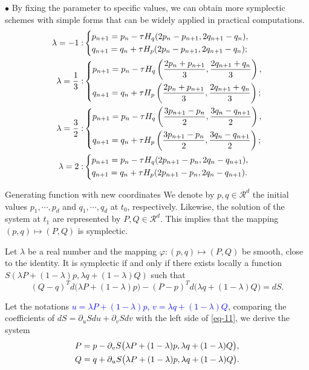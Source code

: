 \documentclass[10pt]{beamer}
\begin{document}
\begin{frame}
\quad\textcolor[rgb]{0,0,1}{$\bullet$} By fixing the parameter to specific values, we can obtain more symplectic schemes with simple forms that can be widely applied in practical computations.
\begin{subequations}\label{eq-10}
\begin{align}
\lambda=-1:&\left\{\aligned
&p_{n+1}=p_n-\tau H_q(2p_n-p_{n+1},2q_{n+1}-q_n),\\
&q_{n+1}=q_n+\tau H_p(2p_n-p_{n+1},2q_{n+1}-q_n);
\endaligned\right.\label{eq-10-a}\\
\lambda=\frac{1}{3}:&\left\{\aligned
&p_{n+1}=p_n-\tau H_q\left(\frac{2p_n+p_{n+1}}{3},\frac{2q_{n+1}+q_n}{3}\right),\\
&q_{n+1}=q_n+\tau H_p\left(\frac{2p_n+p_{n+1}}{3},\frac{2q_{n+1}+q_n}{3}\right);
\endaligned\right.\label{eq-10-b}\\ 
\lambda=\frac{3}{2}:&\left\{\aligned
&p_{n+1}=p_n-\tau H_q\left(\frac{3p_{n+1}-p_n}{2},\frac{3q_n-q_{n+1}}{2}\right),\\
&q_{n+1}=q_n+\tau H_p\left(\frac{3p_{n+1}-p_n}{2},\frac{3q_n-q_{n+1}}{2}\right);
\endaligned\right.\label{eq-10-c}\\
\lambda=2:&\left\{\aligned
&p_{n+1}=p_n-\tau H_q(2p_{n+1}-p_n,2q_n-q_{n+1}),\\
&q_{n+1}=q_n+\tau H_p(2p_{n+1}-p_n,2q_n-q_{n+1}).
\endaligned\right.\label{eq-10-d}
\end{align}
\end{subequations}	
\end{frame}	

\begin{frame}{Generating function with new coordinates}
We denote by $p,q \in\mathcal{R}^d$ the initial values $p_1,\cdots,p_d$ and $q_1,\cdots,q_d$ at $t_0$, respectively. Likewise, the solution of the system at $t_1$ are represented by $P,Q \in\mathcal{R}^d$. This implies that the mapping $(p,q) \mapsto (P,Q)$ is symplectic.

\begin{theorem}
Let $\lambda$ be a real number and the mapping $\varphi:(p,q) \mapsto (P,Q)$ be smooth, close to the identity. It is symplectic if and only if there exists locally a function $S(\lambda P+(1-\lambda)p,\lambda q+(1-\lambda)Q)$ such that
\begin{equation}\label{eq-11}
(Q-q)^Td\big(\lambda P+(1-\lambda)p\big)-(P-p)^Td\big(\lambda q+(1-\lambda)Q\big)=dS.
\end{equation}
\end{theorem}
	
Let the notations \textcolor{blue}{$u = \lambda P+(1-\lambda)p$, $v = \lambda q+(1-\lambda)Q$}, comparing the coefficients of $dS = \partial_uSdu+\partial_vSdv$ with the left side of \eqref{eq-11}, we derive the system
\begin{align}\label{eq-12}
\aligned
&P = p-\partial_vS\big(\lambda P+(1-\lambda)p,\lambda q+(1-\lambda)Q\big),\\
&Q = q+\partial_uS\big(\lambda P+(1-\lambda)p,\lambda q+(1-\lambda)Q\big).
\endaligned
\end{align}
\end{frame}
\end{document}
